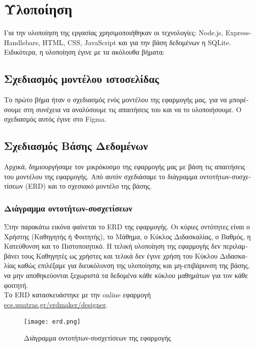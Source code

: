 \documentclass[manuscript,screen,review]{acmart}
\newcommand{\gr}[1]{\foreignlanguage{greek}{#1}}
\begin{document}
\section{\gr{Υλοποίηση}}
\gr{Για την υλοποίηση της εργασίας χρησιμοποιήθηκαν οι τεχνολογίες:} Node.js, Express-Handlebars, HTML, CSS, JavaScript \gr{και για την βάση δεδομένων η} SQLite. 
\\\gr{Ειδικότερα, η υλοποίηση έγινε με τα ακόλουθα βήματα:}

\subsection{\gr{Σχεδιασμός μοντέλου ιστοσελίδας}}
\gr{Το πρώτο βήμα ήταν ο σχεδιασμός ενός μοντέλου της εφαρμογής μας, για να μπορέσουμε στη συνέχεια να αναλύσουμε τις απαιτήσεις του και να το υλοποιήσουμε. Ο σχεδιασμός αυτός έγινε στο} Figma.

\subsection{\gr{Σχεδιασμός Βάσης Δεδομένων}}
\gr{Αρχικά, δημιουργήσαμε τον μικρόκοσμο της εφαρμογής μας με βάση τις απαιτήσεις του μοντέλου της εφαρμογής. Από αυτόν σχεδιάσαμε το διάγραμμα οντοτήτων-συσχετίσεων} (ERD) \gr{και το σχεσιακό μοντέλο της βάσης.}

\subsubsection{\gr{Διάγραμμα οντοτήτων-συσχετίσεων}}

\gr{Στην παρακάτω εικόνα φαίνεται το} ERD \gr{της εφαρμογής. Οι κύριες οντότητες είναι ο Χρήστης (Καθηγητής ή Φοιτητής), το Μάθημα, ο Κύκλος Διδασκαλίας, ο Βαθμός, η Κατεύθυνση και το Πιστοποιητικό. Η τελική υλοποίηση της εφαρμογής δεν περιλαμβάνει τους Καθηγητές ως χρήστες και τελικά δεν έγινε χρήση του Κύκλου Διδασκαλίας καθώς επιλέξαμε για διευκόλυνση της υλοποίησης και μη-επιβάρυνση της βάσης, να μην αποθηκεύονται ξεχωριστά τα δεδομένα κάθε κύκλου μαθημάτων για τον κάθε φοιτητή.}
\\\gr{Το} ERD \gr{κατασκευάστηκε με την} online \gr{εφαρμογή} \href{ece.upatras.gr/erdmaker/designer}{ece.upatras.gr/erdmaker/designer}.

\begin{figure}[H]
    \centering
    \texttt{[image: erd.png]}
    \caption{\gr{Διάγραμμα οντοτήτων-συσχετίσεων της εφαρμογής}}
    \label{fig:enter-label}
\end{figure}
\end{document}
